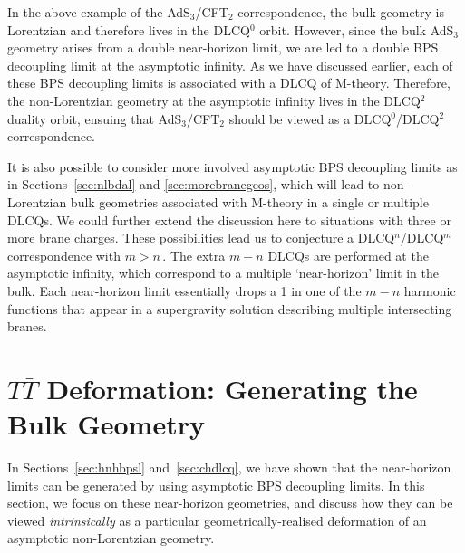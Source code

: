 \documentclass[11pt]{article}
\renewcommand{\emph}[1]{\textit{#1}}
\begin{document}
In the above example of the AdS${}_3$/CFT${}_2$ correspondence, the bulk geometry is Lorentzian and therefore lives in the DLCQ${}^0$ orbit. However, since the bulk AdS${}_3$ geometry arises from a double near-horizon limit, we are led to a double BPS decoupling limit at the asymptotic infinity. As we have discussed earlier, each of these BPS decoupling limits is associated with a DLCQ of M-theory. Therefore, the non-Lorentzian geometry at the asymptotic infinity lives in the DLCQ${}^2$ duality orbit, ensuing that AdS${}_3$/CFT${}_2$ should be viewed as a DLCQ${}^0$/DLCQ${}^2$ correspondence. 

It is also possible to consider more involved asymptotic BPS decoupling limits as in Sections~\ref{sec:nlbdal} and \ref{sec:morebranegeos}, which will lead to non-Lorentzian bulk geometries associated with M-theory in a single or multiple DLCQs. 
We could further extend the discussion here to situations with three or more brane charges.
These possibilities lead us to conjecture a DLCQ${}^n$/DLCQ${}^m$ correspondence with $m > n$\,. The extra $m-n$ DLCQs are performed at the asymptotic infinity, which correspond to a multiple `near-horizon' limit in the bulk. Each near-horizon limit essentially drops a 1 in one of the $m-n$ harmonic functions that appear in a supergravity solution describing multiple intersecting branes. 



\section{\texorpdfstring{$T\bar{T}$}{TTbar} Deformation: Generating the Bulk Geometry} 
\label{sec:TTbar}

In Sections~\ref{sec:hnhbpsl} and~\ref{sec:chdlcq}, we have shown that the near-horizon limits can be generated by using asymptotic BPS decoupling limits. 
In this section, we focus on these near-horizon geometries, and discuss how they can be viewed \emph{intrinsically} as a particular geometrically-realised deformation of an asymptotic non-Lorentzian geometry.
\end{document}
